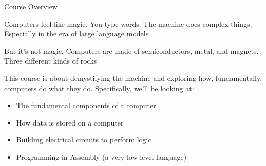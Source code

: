 
\begin{frame}{Course Overview}

Computers feel like magic. You type words. The machine does complex things. Especially in the era of large language models

But it's not magic. Computers are made of semiconductors, metal, and magnets. Three different kinds of rocks

This course is about demystifying the machine and exploring how, fundamentally, computers do what they do. Specifically, we'll be looking at:
\begin{itemize}
\item The fundamental components of a computer
\item How data is stored on a computer
\item Building electrical circuits to perform logic
\item Programming in Assembly (a very low-level language)
\end{itemize}
\end{frame}